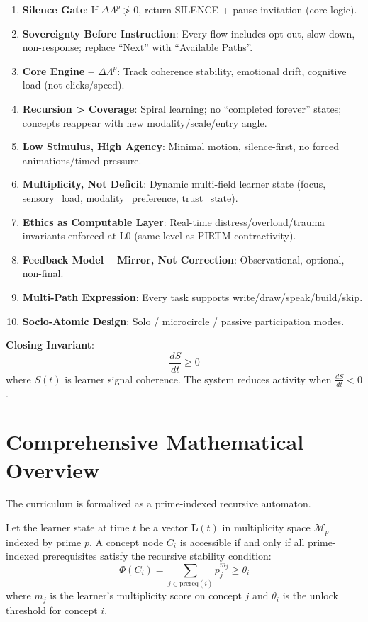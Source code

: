 \documentclass[11pt,letterpaper]{article}
\begin{document}
\begin{enumerate}
\item \textbf{Silence Gate}: If $\Delta\Lambda^p \not> 0$, return SILENCE + pause invitation (core logic).
\item \textbf{Sovereignty Before Instruction}: Every flow includes opt-out, slow-down, non-response; replace ``Next'' with ``Available Paths''.
\item \textbf{Core Engine -- $\Delta\Lambda^p$}: Track coherence stability, emotional drift, cognitive load (not clicks/speed).
\item \textbf{Recursion > Coverage}: Spiral learning; no ``completed forever'' states; concepts reappear with new modality/scale/entry angle.
\item \textbf{Low Stimulus, High Agency}: Minimal motion, silence-first, no forced animations/timed pressure.
\item \textbf{Multiplicity, Not Deficit}: Dynamic multi-field learner state (focus, sensory\_load, modality\_preference, trust\_state).
\item \textbf{Ethics as Computable Layer}: Real-time distress/overload/trauma invariants enforced at L0 (same level as PIRTM contractivity).
\item \textbf{Feedback Model -- Mirror, Not Correction}: Observational, optional, non-final.
\item \textbf{Multi-Path Expression}: Every task supports write/draw/speak/build/skip.
\item \textbf{Socio-Atomic Design}: Solo / microcircle / passive participation modes.
\end{enumerate}

\textbf{Closing Invariant}: 
\[
\frac{dS}{dt} \geq 0
\]
where $S(t)$ is learner signal coherence. The system reduces activity when $\frac{dS}{dt} < 0$.

\section{Comprehensive Mathematical Overview}
The curriculum is formalized as a prime-indexed recursive automaton.

Let the learner state at time $t$ be a vector $\mathbf{L}(t)$ in multiplicity space $\mathcal{M}_p$ indexed by prime $p$. A concept node $C_i$ is accessible if and only if all prime-indexed prerequisites satisfy the recursive stability condition:
\[
\Phi(C_i) = \sum_{j \in \text{prereq}(i)} p_j^{m_j} \geq \theta_i
\]
where $m_j$ is the learner's multiplicity score on concept $j$ and $\theta_i$ is the unlock threshold for concept $i$.
\end{document}
